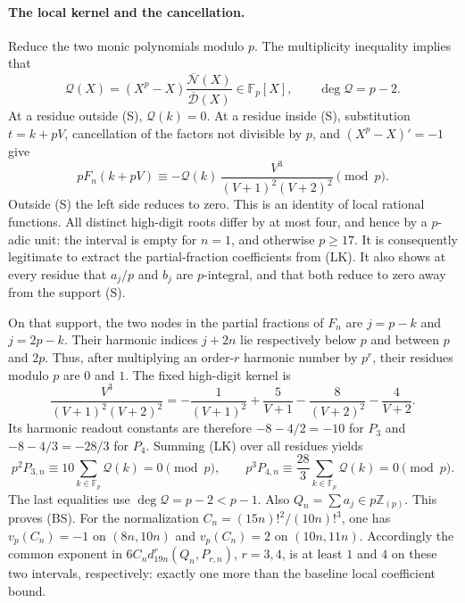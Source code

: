 \paragraph{The local kernel and the cancellation.}
Reduce the two monic polynomials modulo $p$.  The multiplicity inequality
implies that
\[
 \mathcal Q(X)=(X^p-X)\frac{\overline{\mathcal N}(X)}
                               {\overline{\mathcal D}(X)}
             \in\mathbb F_p[X],\qquad \deg\mathcal Q=p-2.
\]
At a residue outside (S), $\mathcal Q(k)=0$.  At a residue inside (S),
substitution $t=k+pV$, cancellation of the factors not divisible by $p$,
and $(X^p-X)'=-1$ give
\[
 pF_n(k+pV)\equiv-\mathcal Q(k)\,
       \frac{V^3}{(V+1)^2(V+2)^2}\pmod p.               \tag{LK}
\]
Outside (S) the left side reduces to zero.  This is an identity of local
rational functions.  All distinct high-digit roots differ by at most
four, and hence by a $p$-adic unit: the interval is empty for $n=1$, and
otherwise $p\ge17$.  It is consequently legitimate to extract the
partial-fraction coefficients from (LK).  It also shows at every residue
that $a_j/p$ and $b_j$ are $p$-integral, and that both reduce to zero away
from the support (S).

On that support, the two nodes in the partial fractions of $F_n$ are
$j=p-k$ and $j=2p-k$.  Their harmonic indices $j+2n$ lie respectively
below $p$ and between $p$ and $2p$.  Thus, after multiplying an order-$r$
harmonic number by $p^r$, their residues modulo $p$ are $0$ and $1$.
The fixed high-digit kernel is
\[
 \frac{V^3}{(V+1)^2(V+2)^2}
 =-\frac1{(V+1)^2}+\frac5{V+1}
   -\frac8{(V+2)^2}-\frac4{V+2}.
\]
Its harmonic readout constants are therefore $-8-4/2=-10$ for $P_3$ and
$-8-4/3=-28/3$ for $P_4$.  Summing (LK) over all residues yields
\[
 p^2P_{3,n}\equiv10\sum_{k\in\mathbb F_p}\mathcal Q(k)=0\pmod p,
 \qquad
 p^3P_{4,n}\equiv\frac{28}{3}
       \sum_{k\in\mathbb F_p}\mathcal Q(k)=0\pmod p.
\]
The last equalities use $\deg\mathcal Q=p-2<p-1$.
Also $Q_n=\sum a_j\in p\mathbb Z_{(p)}$.  This proves (BS).
For the normalization $C_n=(15n)!^2/(10n)!^3$, one has
$v_p(C_n)=-1$ on $(8n,10n)$ and $v_p(C_n)=2$ on $(10n,11n)$.
Accordingly the common exponent in
$6C_nd_{19n}^r(Q_n,P_{r,n})$, $r=3,4$, is at least $1$ and $4$ on these
two intervals, respectively: exactly one more than the baseline local
coefficient bound.
